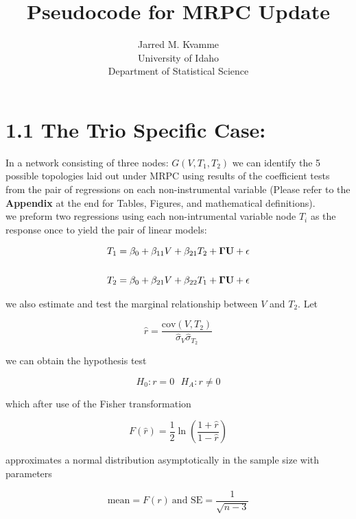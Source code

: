 \documentclass[12pt]{report}
\begin{document}
\begin{titlepage}
\title{Pseudocode for MRPC Update}
\author{ Jarred M. Kvamme \\ University of Idaho \\ Department of Statistical Science }
\maketitle
\end{titlepage}

\newcommand{\indep}{\perp \!\!\! \perp}


\section*{1.1 The Trio Specific Case:}



In a network consisting of three nodes: $G( V, T_1, T_2)$ we can identify the 5 possible topologies laid out under MRPC using results of the coefficient tests from the pair of regressions on each non-instrumental variable (Please refer to the \textbf{Appendix} at the end for Tables, Figures, and mathematical definitions).\\

we preform two regressions using each non-intrumental variable node $T_i$ as the response once to yield the pair of linear models:

\begin{eqnarray}
T_1 = \beta_0 +\beta_{11}V+\beta_{21}T_2+{\bf \Gamma U}+ \epsilon \\
\nonumber\\
T_2 = \beta_0 +\beta_{21}V+\beta_{22}T_1+{\bf \Gamma U}+ \epsilon 
\end{eqnarray}

we also estimate and test the marginal relationship between $V$ and $T_2$. Let

\[ \hat{r} = \frac{\text{cov}(V,T_2)}{\hat{\sigma}_V \hat{\sigma}_{T_2}} \]

we can obtain the hypothesis test

\[ H_0: r = 0 \ \ \ H_A: r \neq 0 \]

which after use of the Fisher transformation

\[  F(\hat{r}) = \frac{1}{2}\ln\left(\frac{1+\hat{r}}{1-\hat{r}}\right) \]

approximates a normal distribution asymptotically in the sample size with parameters

\[  \text{mean} = F(r) \ \text{and SE} = \frac{1}{\sqrt{n-3}}\]
\end{document}
